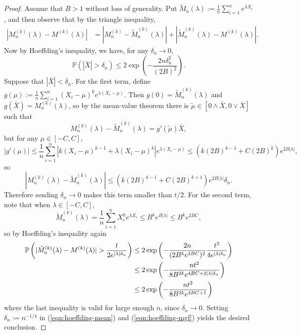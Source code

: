 \documentclass{article}
\theoremstyle{definition}
\newcommand{\1}{\mathbbm{1}}
\renewcommand{\P}{\mathbb{P}}
\begin{document}
\begin{proof}
Assume that $B > 1$ without loss of generality. 
     Put $\tilde M_n(\lambda) := \frac1n\sum_{i=1}^n e^{\lambda X_i}$, and then observe that by the triangle inequality,
    \begin{align*}
        |M_n^{(k)}(\lambda) - M^{(k)}(\lambda)| &= |M_n^{(k)} - \tilde M_n^{(k)}(\lambda)| + |\tilde M_n^{(k)}(\lambda) - M^{(k)}(\lambda)|.
    \end{align*}
    Now by Hoeffding's inequality, we have, for any $\delta_n \to 0$, 
    \begin{equation}
        \P(|\bar X| > \delta_n) \leq 2\exp\left(-\frac{2n\delta_n^2}{(2B)^2}\right). \label{eqn:hoeffding-mean}
    \end{equation}
    Suppose that $|\bar X| < \delta_n$. For the first term, define $g(\mu) := \frac1n\sum_{i=1}^n (X_i - \mu)^k e^{\lambda (X_i - \mu)}$. Then $g(0) = \tilde M_n^{(k)}(\lambda)$ and $g(\bar X) = M_n^{(k)}(\lambda)$, so by the mean-value theorem there is $\tilde \mu \in [0 \wedge \bar X, 0 \vee \bar X]$ such that 
    \[
    M_n^{(k)}(\lambda) - \tilde M_n^{(k)}(\lambda) = g'(\tilde \mu)\bar X,
    \]
    but for any $\mu \in [-C, C]$, 
    \[
    |g'(\mu)| \leq \frac1n\sum_{i=1}^n \left|k(X_i - \mu)^{k-1} + \lambda(X_i - \mu)^{k}\right|e^{\lambda(X_i - \mu)} \leq \left(k(2B)^{k-1} + C(2B)^{k}\right)e^{2B|\lambda|},
    \]
    so 
    \[
    |M_n^{(k)}(\lambda) - \tilde M_n^{(k)}(\lambda)| \leq \left(k(2B)^{k-1} + C(2B)^{k+1}\right)e^{2B|\lambda| }\delta_n.
    \]
    Therefore sending $\delta_n \to 0$ makes this term smaller than $t/2$. 
    For the second term, note that when $\lambda \in [-C, C]$, 
    \[
    \tilde M^{(k)}_n(\lambda) = \frac1n\sum_{i=1}^n X_i^{k}e^{\lambda X_i} \leq B^ke^{B|\lambda|} \leq B^ke^{2BC},
    \]
    so by Hoeffding's inequality again 
    \begin{align}
        \P\left(|\tilde M_n^{(k)}(\lambda) - M^{(k)}(\lambda)| > \frac{t}{2e^{|\lambda|\delta_n}}\right) &\leq 2\exp\left(-\frac{2n}{(2B^ke^{2BC})^2}\frac{t^2}{4e^{|\lambda| \delta_n}}\right)\notag\\ &\leq  2\exp\left(-\frac{nt^2}{8B^{2k}e^{4BC+2|\lambda|\delta_n}}\right)
        \notag \\ 
        &\leq 
2\exp\left(-\frac{nt^2}{8B^{2k}e^{4BC+1}}\right)\label{eqn:hoeffding-mgf}
    \end{align}
    where the last inequality is valid for large enough $n$, since $\delta_n \to 0$. Setting $\delta_n := n^{-1/4}$ in (\ref{eqn:hoeffding-mean}) and (\ref{eqn:hoeffding-mgf}) yields the desired conclusion.
\end{proof}
\end{document}
